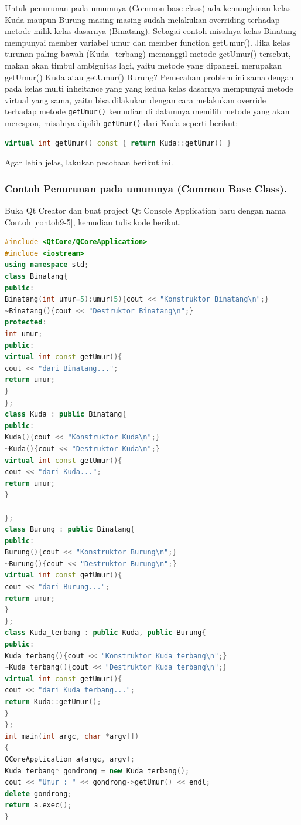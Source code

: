 Untuk penurunan pada umumnya (Common base class) ada kemungkinan kelas
Kuda maupun Burung masing-masing sudah melakukan overriding terhadap
metode milik kelas dasarnya (Binatang). Sebagai contoh misalnya kelas
Binatang mempunyai member variabel umur dan member function getUmur().
Jika kelas turunan paling bawah (Kuda\_terbang) memanggil metode
getUmur() tersebut, makan akan timbul ambiguitas lagi, yaitu metode yang
dipanggil merupakan getUmur() Kuda atau getUmur() Burung? Pemecahan
problem ini sama dengan pada kelas multi inheitance yang yang kedua
kelas dasarnya mempunyai metode virtual yang sama, yaitu bisa dilakukan
dengan cara melakukan override terhadap metode \texttt{getUmur()} kemudian di
dalamnya memilih metode yang akan merespon, misalnya dipilih \texttt{getUmur()}
dari Kuda seperti berikut:

\begin{lstlisting}[language=c++, numbers=none]
virtual int getUmur() const { return Kuda::getUmur() }
\end{lstlisting}

Agar lebih jelas, lakukan pecobaan berikut ini.

\subsubsection*{Contoh  Penurunan pada umumnya (Common Base Class).}

Buka Qt Creator dan buat project Qt Console Application baru dengan nama
Contoh \ref{contoh9-5}, kemudian tulis kode berikut.

\begin{lstlisting}[language=c++, caption= Penurunan pada umumnya (Common Base Class), label=contoh9-5]
#include <QtCore/QCoreApplication>
#include <iostream>
using namespace std;
class Binatang{
public:
Binatang(int umur=5):umur(5){cout << "Konstruktor Binatang\n";}
~Binatang(){cout << "Destruktor Binatang\n";}
protected:
int umur;
public:
virtual int const getUmur(){
cout << "dari Binatang...";
return umur;
}
};
class Kuda : public Binatang{
public:
Kuda(){cout << "Konstruktor Kuda\n";}
~Kuda(){cout << "Destruktor Kuda\n";}
virtual int const getUmur(){
cout << "dari Kuda...";
return umur;
}
                                        
};
class Burung : public Binatang{
public:
Burung(){cout << "Konstruktor Burung\n";}
~Burung(){cout << "Destruktor Burung\n";}
virtual int const getUmur(){
cout << "dari Burung...";
return umur;
}
};
class Kuda_terbang : public Kuda, public Burung{
public:
Kuda_terbang(){cout << "Konstruktor Kuda_terbang\n";}
~Kuda_terbang(){cout << "Destruktor Kuda_terbang\n";}
virtual int const getUmur(){
cout << "dari Kuda_terbang...";
return Kuda::getUmur();
}
};
int main(int argc, char *argv[])
{
QCoreApplication a(argc, argv);
Kuda_terbang* gondrong = new Kuda_terbang();
cout << "Umur : " << gondrong->getUmur() << endl;
delete gondrong;
return a.exec();
}
\end{lstlisting}

